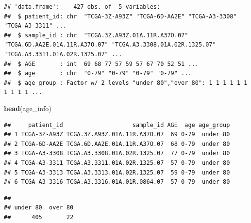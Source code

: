 \documentclass[
]{article}
\newenvironment{Shaded}{\begin{snugshade}}{\end{snugshade}}
\newcommand{\AttributeTok}[1]{\textcolor[rgb]{0.13,0.29,0.53}{#1}}
\newcommand{\CommentTok}[1]{\textcolor[rgb]{0.56,0.35,0.01}{\textit{#1}}}
\newcommand{\FunctionTok}[1]{\textcolor[rgb]{0.13,0.29,0.53}{\textbf{#1}}}
\newcommand{\NormalTok}[1]{#1}
\newcommand{\OtherTok}[1]{\textcolor[rgb]{0.56,0.35,0.01}{#1}}
\newcommand{\SpecialCharTok}[1]{\textcolor[rgb]{0.81,0.36,0.00}{\textbf{#1}}}
\newcommand{\StringTok}[1]{\textcolor[rgb]{0.31,0.60,0.02}{#1}}
\begin{document}
\begin{verbatim}
## 'data.frame':    427 obs. of  5 variables:
##  $ patient_id: chr  "TCGA-3Z-A93Z" "TCGA-6D-AA2E" "TCGA-A3-3308" "TCGA-A3-3311" ...
##  $ sample_id : chr  "TCGA.3Z.A93Z.01A.11R.A37O.07" "TCGA.6D.AA2E.01A.11R.A37O.07" "TCGA.A3.3308.01A.02R.1325.07" "TCGA.A3.3311.01A.02R.1325.07" ...
##  $ AGE       : int  69 68 77 57 59 57 67 70 52 51 ...
##  $ age       : chr  "0-79" "0-79" "0-79" "0-79" ...
##  $ age_group : Factor w/ 2 levels "under 80","over 80": 1 1 1 1 1 1 1 1 1 1 ...
\end{verbatim}

\begin{Shaded}
\begin{Highlighting}[]
\FunctionTok{head}\NormalTok{(age\_info)}
\end{Highlighting}
\end{Shaded}

\begin{verbatim}
##     patient_id                    sample_id AGE  age age_group
## 1 TCGA-3Z-A93Z TCGA.3Z.A93Z.01A.11R.A37O.07  69 0-79  under 80
## 2 TCGA-6D-AA2E TCGA.6D.AA2E.01A.11R.A37O.07  68 0-79  under 80
## 3 TCGA-A3-3308 TCGA.A3.3308.01A.02R.1325.07  77 0-79  under 80
## 4 TCGA-A3-3311 TCGA.A3.3311.01A.02R.1325.07  57 0-79  under 80
## 5 TCGA-A3-3313 TCGA.A3.3313.01A.02R.1325.07  59 0-79  under 80
## 6 TCGA-A3-3316 TCGA.A3.3316.01A.01R.0864.07  57 0-79  under 80
\end{verbatim}

\begin{Shaded}
\end{Shaded}

\begin{verbatim}
## 
## under 80  over 80 
##      405       22
\end{verbatim}

\begin{Shaded}
\end{Shaded}
\end{document}
